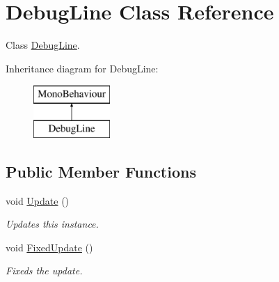 \hypertarget{class_debug_line}{}\section{Debug\+Line Class Reference}
\label{class_debug_line}


Class \hyperlink{class_debug_line}{Debug\+Line}.  


Inheritance diagram for Debug\+Line\+:\begin{figure}[H]
\begin{center}
\leavevmode
\includegraphics[height=2.000000cm]{class_debug_line}
\end{center}
\end{figure}
\subsection*{Public Member Functions}
\begin{DoxyCompactItemize}
\item 
void \hyperlink{class_debug_line_abe4fa3efa236e9da37c69612e22fc41e}{Update} ()
\begin{DoxyCompactList}\small\item\em Updates this instance. \end{DoxyCompactList}\item 
void \hyperlink{class_debug_line_ad3f88ca561b551a227d194afad58fb82}{Fixed\+Update} ()
\begin{DoxyCompactList}\small\item\em Fixeds the update. \end{DoxyCompactList}\end{DoxyCompactItemize}
